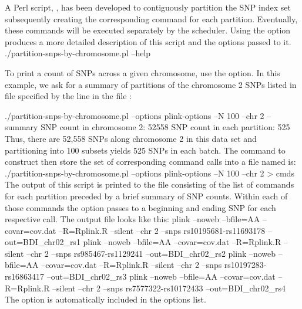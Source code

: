 
\startsubsubject[title={Partitioning SNP indicies along a chromosome}]

A Perl script,
,
has been developed to contiguously partition the SNP index set
subsequently creating the corresponding \PLINK command for each partition.
Eventually, these commands will be executed separately by the scheduler.
%
Using the  option produces a more detailed description of this
script and the options passed to it.
\startSTDIN
./partition-snps-by-chromosome.pl --help
\stopSTDIN

To print a count of SNPs across a given chromosome, use the  option.
In this example, we ask for a summary of 
 partitions of the 
chromosome 2 SNPs listed in file 
specified by the  line in the file :

\startSTDIN
./partition-snps-by-chromosome.pl --options plink-options --N 100 --chr 2 --summary
\stopSTDIN
\startSTDOUT
SNP count in chromosome 2:   52558
SNP count in each partition:  525
\stopSTDOUT
Thus, there are 52,558 SNPs along chromosome 2 in this data set and
partitioning into 100 subsets yields 525 SNPs in each batch.
The command to construct then store the set of corresponding \PLINK command calls into
a file named  is:
\startSTDIN
./partition-snps-by-chromosome.pl --options plink-options --N 100 --chr 2 > cmds
\stopSTDIN
The output of this script is printed to the file  consisting of the list of \PLINK commands for each partition preceded by a brief summary of SNP counts.  Within each of those commands the  option passes to \PLINK a beginning and ending SNP for each respective \PLINK call.  The output file looks like this:
\startSTDOUT
plink --noweb  --bfile=AA --covar=cov.dat --R=Rplink.R --silent --chr 2 --snps rs10195681-rs11693178 --out=BDI_chr02_rs1
plink --noweb  --bfile=AA --covar=cov.dat --R=Rplink.R --silent --chr 2 --snps rs985467-rs1129241 --out=BDI_chr02_rs2
plink --noweb  --bfile=AA --covar=cov.dat --R=Rplink.R --silent --chr 2 --snps rs10197283-rs16863417 --out=BDI_chr02_rs3
plink --noweb  --bfile=AA --covar=cov.dat --R=Rplink.R --silent --chr 2 --snps rs7577322-rs10172433 --out=BDI_chr02_rs4
\stopSTDOUT
The  option is automatically included in the options list.

